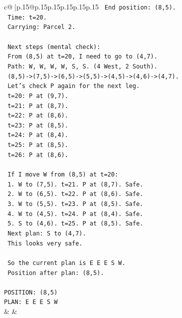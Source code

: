 \documentclass{article}
\begin{document}
{\begin{supertabular}{c@{$\;$}|p{.15\linewidth}@{}p{.15\linewidth}p{.15\linewidth}p{.15\linewidth}p{.15\linewidth}p{.15\linewidth}}
{{{\texttt{   End position: (8,5).} \\
\texttt{   Time: t=20.} \\
\texttt{   Carrying: Parcel 2.} \\
\\ 
\texttt{   Next steps (mental check):} \\
\texttt{   From (8,5) at t=20, I need to go to (4,7).} \\
\texttt{   Path: W, W, W, W, S, S. (4 West, 2 South).} \\
\texttt{   (8,5){-}>(7,5){-}>(6,5){-}>(5,5){-}>(4,5){-}>(4,6){-}>(4,7).} \\
\texttt{   Let's check P again for the next leg.} \\
\texttt{   t=20: P at (9,7).} \\
\texttt{   t=21: P at (8,7).} \\
\texttt{   t=22: P at (8,6).} \\
\texttt{   t=23: P at (8,5).} \\
\texttt{   t=24: P at (8,4).} \\
\texttt{   t=25: P at (8,5).} \\
\texttt{   t=26: P at (8,6).} \\
\\ 
\texttt{   If I move W from (8,5) at t=20:} \\
\texttt{   1. W to (7,5). t=21. P at (8,7). Safe.} \\
\texttt{   2. W to (6,5). t=22. P at (8,6). Safe.} \\
\texttt{   3. W to (5,5). t=23. P at (8,5). Safe.} \\
\texttt{   4. W to (4,5). t=24. P at (8,4). Safe.} \\
\texttt{   5. S to (4,6). t=25. P at (8,5). Safe.} \\
\texttt{   Next plan: S to (4,7).} \\
\texttt{   This looks very safe.} \\
\\ 
\texttt{   So the current plan is E E E S W.} \\
\texttt{   Position after plan: (8,5).} \\
\\ 
\texttt{POSITION: (8,5)} \\
\texttt{PLAN: E E E S W} \\
            }
        }
    }
    & & \\ \\


\end{supertabular}}
\end{document}
